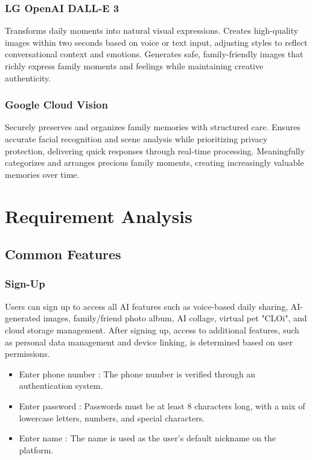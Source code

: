 \documentclass[conference]{IEEEtran}
\begin{document}
        \subsubsection{LG OpenAI DALL-E 3}
        Transforms daily moments into natural visual expressions. Creates high-quality images within two seconds based on voice or text input, adjusting styles to reflect conversational context and emotions. Generates safe, family-friendly images that richly express family moments and feelings while maintaining creative authenticity.

        \subsubsection{Google Cloud Vision}
        Securely preserves and organizes family memories with structured care. Ensures accurate facial recognition and scene analysis while prioritizing privacy protection, delivering quick responses through real-time processing. Meaningfully categorizes and arranges precious family moments, creating increasingly valuable memories over time.

\section{Requirement Analysis}
    \subsection{Common Features}
        \subsubsection{Sign-Up}
            Users can sign up to access all AI features such as voice-based daily sharing, AI-generated images, family/friend photo album, AI collage, virtual pet "CLOi", and cloud storage management. After signing up, access to additional features, such as personal data management and device linking, is determined based on user permissions.
            \begin{itemize}
                \item Enter phone number : The phone number is verified through an authentication system.
                \item Enter password : Passwords must be at least 8 characters long, with a mix of lowercase letters, numbers, and special characters.
                \item Enter name : The name is used as the user's default nickname on the platform.
            \end{itemize}
\end{document}
